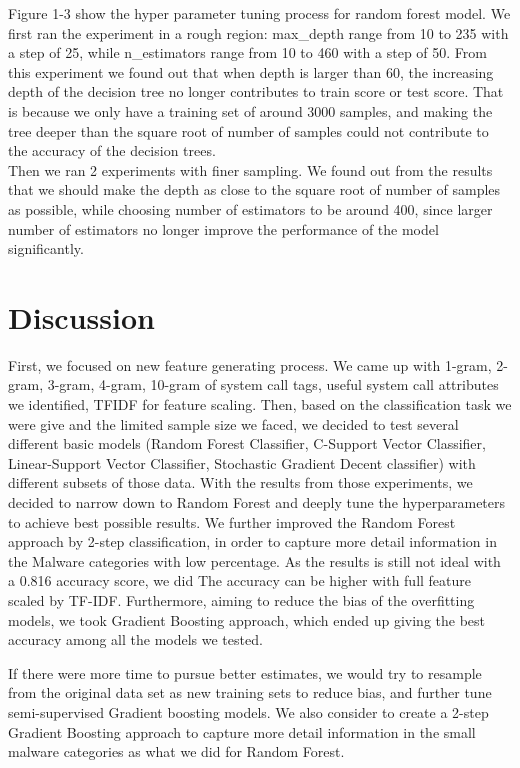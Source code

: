 \documentclass[11pt]{article}
\begin{document}
Figure 1-3 show the hyper parameter tuning process for random forest model. We first ran the experiment in a rough region: max\_depth range from 10 to 235 with a step of 25, while n\_estimators range from 10 to 460 with a step of 50. From this experiment we found out that when depth is larger than 60, the increasing depth of the decision tree no longer contributes to train score or test score. That is because we only have a training set of around 3000 samples, and making the tree deeper than the square root of number of samples could not contribute to the accuracy of the decision trees. \\
Then we ran 2 experiments with finer sampling. We found out from the results that we should make the depth as close to the square root of number of samples as possible, while choosing number of estimators to be around 400, since larger number of estimators no longer improve the performance of the model significantly. 

\section{Discussion} 

First, we focused on new feature generating process. We came up with 1-gram, 2-gram, 3-gram, 4-gram, 10-gram of system call tags, useful system call attributes we identified, TFIDF for feature scaling. Then, based on the classification task we were give and the limited sample size we faced, we decided to test several different basic models (Random Forest Classifier, C-Support Vector Classifier, Linear-Support Vector Classifier, Stochastic Gradient Decent classifier) with different subsets of those data. With the results from those experiments, we decided to narrow down to Random Forest and deeply tune the hyperparameters to achieve best possible results. We further improved the Random Forest approach by 2-step classification, in order to capture more detail information in the Malware categories with low percentage. As the results is still not ideal with a 0.816 accuracy score, we did The accuracy can be higher with full feature scaled by TF-IDF. Furthermore, aiming to reduce the bias of the overfitting models, we took Gradient Boosting approach, which ended up giving the best accuracy among all the models we tested. 

If there were more time to pursue better estimates, we would try to resample from the original data set as new training sets to reduce bias, and further tune semi-supervised Gradient boosting models. We also consider to create a 2-step Gradient Boosting approach to capture more detail information in the small malware categories as what we did for Random Forest.


\end{document}
